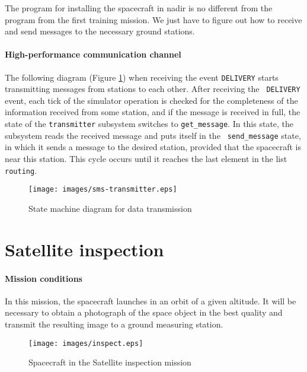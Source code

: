 \documentclass[12pt,a4paper]{article}
\begin{document}
The program for installing the spacecraft in nadir is no different from the program from the first training mission. We just have to figure out how to receive and send messages to the necessary ground stations.

\paragraph{High-performance communication channel} The following diagram (Figure \ref{Pic:SMS-transmitter-en}) when receiving the event \verb'DELIVERY' starts transmitting messages from stations to each other. After receiving the \verb' DELIVERY' event, each tick of the simulator operation is checked for the completeness of the information received from some station, and if the message is received in full, the state of the \verb'transmitter' subsystem switches to \verb'get_message'. In this state, the subsystem reads the received message and puts itself in the \verb' send_message' state, in which it sends a message to the desired station, provided that the spacecraft is near this station. This cycle occurs until it reaches the last element in the list \verb' routing'.

\begin{figure}[tbh]
  \begin{center}
    \texttt{[image: images/sms-transmitter.eps]}
    \caption{State machine diagram for data transmission}
    \label{Pic:SMS-transmitter-en}
  \end{center}
\end{figure}


\section{Satellite inspection}

\paragraph{Mission conditions} In this mission, the spacecraft launches in an orbit of a given altitude. It will be necessary to obtain a photograph of the space object in the best quality and transmit the resulting image to a ground measuring station.

\begin{figure}[tbh]
  \begin{center}
    \texttt{[image: images/inspect.eps]}
    \caption{Spacecraft in the Satellite inspection mission}
    \label{Pic:Inspection-en}
  \end{center}
\end{figure}
\end{document}
